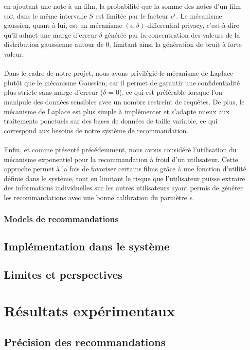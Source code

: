 \documentclass{article}
\begin{document}
    en ajoutant une note à un film, la probabilité que la somme des notes d'un film soit dans le même intervalle $S$ est limitée par le facteur $e^{\epsilon}$.
    Le mécanisme gaussien, quant à lui, est un mécanisme $(\epsilon,\delta)$-differential privacy, c'est-à-dire qu'il admet une marge d'erreur $\delta$ générée
    par la concentration des valeurs de la distribution gaussienne autour de 0, limitant ainsi la génération de bruit à forte valeur.\\
    $ $\\
    Dans le cadre de notre projet, nous avons privilégié le mécanisme de Laplace plutôt que le mécanisme Gaussien, car il permet de garantir une confidentialité plus stricte sans marge d’erreur ($\delta$ = 0),
    ce qui est préférable lorsque l’on manipule des données sensibles avec un nombre restreint de requêtes. De plus, le mécanisme de Laplace est plus simple à implémenter et s’adapte mieux aux traitements ponctuels sur des bases de données de taille variable,
    ce qui correspond aux besoins de notre système de recommandation.\\
    $ $\\
    Enfin, et comme présenté précédemment, nous avons considéré l'utilisation du mécanisme exponentiel pour la recommandation à froid d'un utilisateur.
    Cette approche permet à la fois de favoriser certains films grâce à une fonction d'utilité définie dans le système, tout en limitant le risque que
    l'utilisateur puisse extraire des informations individuelles sur les autres utilisateurs ayant permis de générer les recommandations avec une bonne
    calibration du parmètre $\epsilon$.
    \subsubsection{Models de recommandations}


    \subsection{Implémentation dans le système}
    \subsection{Limites et perspectives}


    \section{Résultats expérimentaux}
    \subsection{Précision des recommandations}
\end{document}
